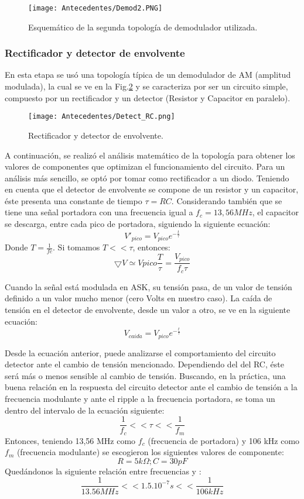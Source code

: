 \begin{figure}[H]
\centering
\texttt{[image: Antecedentes/Demod2.PNG]}
\caption{Esquemático de la segunda topología de demodulador utilizada.}
\label{fig:Demod2}
\end{figure}

\subsubsection{Rectificador y detector de envolvente}
En esta etapa se usó una topología típica de
un demodulador de AM (amplitud modulada),
la cual se ve en la Fig.\ref{fig:Detect} y se caracteriza
por ser un circuito simple, compuesto por un
rectificador y un detector (Resistor y Capacitor
en paralelo).
\begin{figure}[H]
\centering
\texttt{[image: Antecedentes/Detect\_RC.png]}
\caption{Rectificador y detector de envolvente.}
\label{fig:Detect}
\end{figure}
A continuación, se realizó el análisis matemático
de la topología para obtener los valores de
componentes que optimizan el funcionamiento
del circuito. Para un análisis más sencillo, se
optó por tomar como rectificador a un diodo.
Teniendo en cuenta que el detector de envolvente
se compone de un resistor y un capacitor, éste presenta una constante de tiempo $\tau = RC$.
Considerando también que se tiene una señal
portadora con una frecuencia igual a $f_c =
13,56 MHz$, el capacitor se descarga, entre
cada pico de portadora, siguiendo la siguiente
ecuación:
$$V'_{pico} = V_{pico}e^{-\frac{t}{\tau}}$$
Donde $T = \frac{1}{fc}$. Si tomamos $T << \tau$, entonces:
$$\bigtriangledown V \simeq V{pico}\frac{T}{\tau} = \frac{V_{pico}}{f_c \tau}$$

Cuando la señal está modulada en ASK, su
tensión pasa, de un valor de tensión definido
a un valor mucho menor (cero Volts en nuestro
caso). La caída de tensión en el detector
de envolvente, desde un valor a otro, se ve en la siguiente ecuación:
$$V_{caida} = V_{pico}e^{-\frac{t}{\tau}}$$

Desde la ecuación anterior, puede analizarse
el comportamiento del circuito detector ante el
cambio de tensión mencionado. Dependiendo
del \tau del RC, éste será más o menos sensible al
cambio de tensión.
Buscando, en la práctica, una buena relación
en la respuesta del circuito detector ante el
cambio de tensión a la frecuencia modulante
y ante el ripple a la frecuencia portadora, se
toma un \tau dentro del intervalo de la ecuación
siguiente:
$$\frac{1}{f_c} << \tau << \frac{1}{f_m}$$
Entonces, teniendo 13,56 MHz como $f_c$ (frecuencia
de portadora) y 106 kHz como $f_m$ (frecuencia
modulante) se escogieron los siguientes
valores de componente:
$$R = 5 k\Omega ; C = 30 pF$$
Quedándonos la siguiente relación entre frecuencias
y \tau:
$$\frac{1}{13.56MHz}<<1.5.10^{-7}s<<\frac{1}{106kHz}$$

